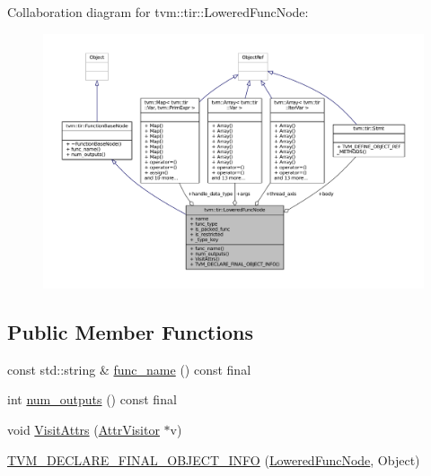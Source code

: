 Collaboration diagram for tvm\+:\+:tir\+:\+:Lowered\+Func\+Node\+:
\nopagebreak
\begin{figure}[H]
\begin{center}
\leavevmode
\includegraphics[width=350pt]{classtvm_1_1tir_1_1LoweredFuncNode__coll__graph}
\end{center}
\end{figure}
\subsection*{Public Member Functions}
\begin{DoxyCompactItemize}
\item 
const std\+::string \& \hyperlink{classtvm_1_1tir_1_1LoweredFuncNode_adea0c3a6dee4e102714d23340586fc2b}{func\+\_\+name} () const final
\item 
int \hyperlink{classtvm_1_1tir_1_1LoweredFuncNode_a00ac40b83b414dfa2af245f7a5117d38}{num\+\_\+outputs} () const final
\item 
void \hyperlink{classtvm_1_1tir_1_1LoweredFuncNode_a7a73f0bf8f7c13d1b48caaffd607677f}{Visit\+Attrs} (\hyperlink{classtvm_1_1AttrVisitor}{Attr\+Visitor} $\ast$v)
\item 
\hyperlink{classtvm_1_1tir_1_1LoweredFuncNode_a818db7493833f0942640fae168c9ff8a}{T\+V\+M\+\_\+\+D\+E\+C\+L\+A\+R\+E\+\_\+\+F\+I\+N\+A\+L\+\_\+\+O\+B\+J\+E\+C\+T\+\_\+\+I\+N\+FO} (\hyperlink{classtvm_1_1tir_1_1LoweredFuncNode}{Lowered\+Func\+Node}, Object)
\end{DoxyCompactItemize}
